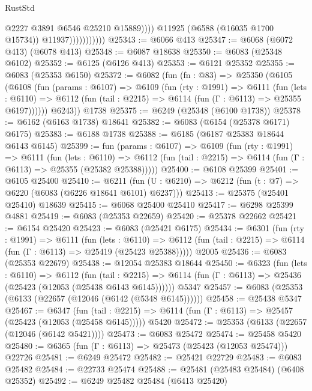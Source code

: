\begin{lexlean}{RustStd}
\begin{coremodule}
                                  @2227
                                  @3891
                                  @6546
                                  @25210
                                  @15889))))
                          @11925
                          (@6588 (@16035 @1700 @15734))
                          @11937)))))))))))
@25343 := @6066 @413
@25347 := @6068 (@6072 @413) (@6078 @413)
@25348 := @6087 @18638
@25350 := @6083 (@25348 @6102)
@25352 := @6125 (@6126 @413)
@25353 := @6121 @25352
@25355 := @6083 (@25353 @6150)
@25372 := @6082
    (fun (fn : @83) =>
    @25350
      (@6105
        (@6108
          (fun (params : @6107) =>
          @6109
            (fun (rty : @1991) =>
            @6111
              (fun (lets : @6110) =>
              @6112 (fun (tail : @2215) => @6114 (fun (Γ : @6113) => @25355 @6197))))))
        @6243))
    @1738
@25375 := @6249 (@25348 (@6100 @1738))
@25378 := @6162 (@6163 @1738) @18641
@25382 := @6083 (@6154 (@25378 @6171) @6175)
@25383 := @6188 @1738
@25388 := @6185 (@6187 @25383 @18644 @6143 @6145)
@25399 := fun (params : @6107) =>
  @6109
    (fun (rty : @1991) =>
    @6111
      (fun (lets : @6110) =>
      @6112 (fun (tail : @2215) => @6114 (fun (Γ : @6113) => @25355 (@25382 @25388)))))
@25400 := @6108 @25399
@25401 := @6105 @25400
@25410 := @6211
    (fun (U : @6210) => @6212 (fun (t : @7) => @6220 (@6083 (@6226 @18641 @6101) @6237)))
@25413 := @25375 (@25401 @25410) @18639
@25415 := @6068 @25400 @25410
@25417 := @6298 @25399 @4881
@25419 := @6083 (@25353 @22659)
@25420 := @25378 @22662
@25421 := @6154 @25420
@25423 := @6083 (@25421 @6175)
@25434 := @6301
    (fun (rty : @1991) =>
    @6111
      (fun (lets : @6110) =>
      @6112 (fun (tail : @2215) => @6114 (fun (Γ : @6113) => @25419 (@25423 @25388)))))
    @2005
@25436 := @6083 (@25353 @22679)
@25438 := @12054 @25383 @18644
@25450 := @6323
    (fun (lets : @6110) =>
    @6112
      (fun (tail : @2215) =>
      @6114 (fun (Γ : @6113) => @25436 (@25423 (@12053 (@25438 @6143 @6145))))))
    @5347
@25457 := @6083 (@25353 (@6133 (@22657 (@12046 (@6142 (@5348 @6145))))))
@25458 := @25438 @5347
@25467 := @6347
    (fun (tail : @2215) => @6114 (fun (Γ : @6113) => @25457 (@25423 (@12053 (@25458 @6145)))))
    @5420
@25472 := @25353 (@6133 (@22657 (@12046 (@6142 @5421))))
@25473 := @6083 @25472
@25474 := @25458 @5420
@25480 := @6365 (fun (Γ : @6113) => @25473 (@25423 (@12053 @25474))) @22726
@25481 := @6249 @25472
@25482 := @25421 @22729
@25483 := @6083 @25482
@25484 := @22733 @25474
@25488 := @25481 (@25483 @25484) (@6408 @25352)
@25492 := @6249 @25482 @25484 (@6413 @25420)

\end{coremodule}
\end{lexlean}
